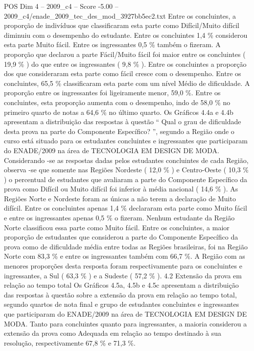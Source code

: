 \begin{textsample}{POS Dim 4 – 2009\_c4 – Score -5.00 – 2009\_c4/enade\_2009\_tec\_des\_mod\_3927bb5ec2.txt}
Entre os concluintes, a proporção de indivíduos que classificaram esta parte como Difícil/Muito difícil diminuiu com o desempenho do estudante.
Entre os concluintes 1,4 \% considerou esta parte Muito fácil.
Entre os ingressantes 0,5 \% também o fizeram.
A proporção que declarou a parte Fácil/Muito fácil foi maior entre os concluintes ( 19,9 \% ) do que entre os ingressantes ( 9,8 \% ).
Entre os concluintes a proporção dos que consideraram esta parte como fácil cresce com o desempenho.
Entre os concluintes, 65,5 \% classificaram esta parte com um nível Médio de dificuldade.
A proporção entre os ingressantes foi ligeiramente menor, 59,0 \%.
Entre os concluintes, esta proporção aumenta com o desempenho, indo de 58,0 \% no primeiro quarto de notas a 64,6 \% no último quarto.
Os Gráficos 4.4a e 4.4b apresentam a distribuição das respostas à questão “ Qual o grau de dificuldade desta prova na parte do Componente Específico? ”, segundo a Região onde o curso está situado para os estudantes concluintes e ingressantes que participaram do ENADE/2009 na área de TECNOLOGIA EM DESIGN DE MODA.
Considerando -se as respostas dadas pelos estudantes concluintes de cada Região, observa -se que somente nas Regiões Nordeste ( 12,0 \% ) e Centro-Oeste ( 10,3 \% ) o percentual de estudantes que avaliaram a parte do Componente Específico da prova como Difícil ou Muito difícil foi inferior à média nacional ( 14,6 \% ).
As Regiões Norte e Nordeste foram as únicas a não terem a declaração de Muito difícil.
Entre os concluintes apenas 1,4 \% declararam esta parte como Muito fácil e entre os ingressantes apenas 0,5 \% o fizeram.
Nenhum estudante da Região Norte classificou essa parte como Muito fácil.
Entre os concluintes, a maior proporção de estudantes que considerou a parte do Componente Específico da prova como de dificuldade média entre todas as Regiões brasileiras, foi na Região Norte com 83,3 \% e entre os ingressantes também com 66,7 \%.
A Região com as menores proporções desta resposta foram respectivamente para os concluintes e ingressantes, a Sul ( 63,3 \% ) e a Sudeste ( 57,2 \% ). 4.2 Extensão da prova em relação ao tempo total Os Gráficos 4.5a, 4.5b e 4.5c apresentam a distribuição das respostas à questão sobre a extensão da prova em relação ao tempo total, segundo quartos de nota final e grupo de estudantes concluintes e ingressantes que participaram do ENADE/2009 na área de TECNOLOGIA EM DESIGN DE MODA.
Tanto para concluintes quanto para ingressantes, a maioria considerou a extensão da prova como Adequada em relação ao tempo destinado à sua resolução, respectivamente 67,8 \% e 71,3 \%.

\end{textsample}
